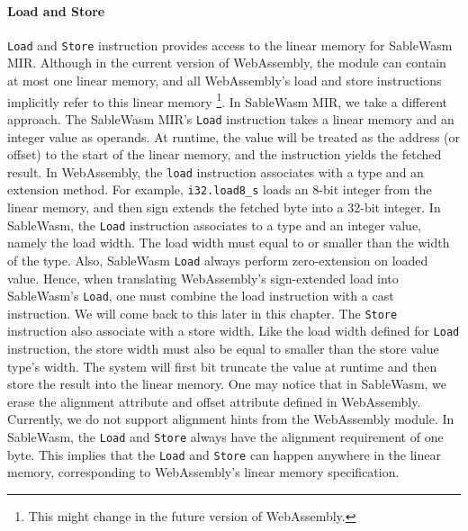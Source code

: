\paragraph{Load and Store}
\texttt{Load} and \texttt{Store} instruction provides access to the linear
memory for SableWasm MIR. Although in the current version of WebAssembly, the
module can contain at most one linear memory, and all WebAssembly's load and
store instructions implicitly refer to this linear memory \footnote{This might
  change in the future version of WebAssembly.}. In SableWasm MIR, we take a
different approach. The SableWasm MIR's \texttt{Load} instruction takes a linear
memory and an integer value as operands. At runtime, the value will be treated
as the address (or offset) to the start of the linear memory, and the
instruction yields the fetched result. In WebAssembly, the \texttt{load}
instruction associates with a type and an extension method. For example,
\texttt{i32.load8\_s} loads an 8-bit integer from the linear memory, and then
sign extends the fetched byte into a 32-bit integer. In SableWasm, the
\texttt{Load} instruction associates to a type and an integer value, namely the
load width. The load width must equal to or smaller than the width of the type.
Also, SableWasm \texttt{Load} always perform zero-extension on loaded value.
Hence, when translating WebAssembly's sign-extended load into SableWasm's
\texttt{Load}, one must combine the load instruction with a cast instruction.
We will come back to this later in this chapter. The \texttt{Store} instruction
also associate with a store width. Like the load width defined for \texttt{Load}
instruction, the store width must also be equal to smaller than the store value
type's width. The system will first bit truncate the value at runtime and then
store the result into the linear memory. One may notice that in SableWasm, we
erase the alignment attribute and offset attribute defined in WebAssembly.
Currently, we do not support alignment hints from the WebAssembly module. In
SableWasm, the \texttt{Load} and \texttt{Store} always have the alignment
requirement of one byte. This implies that the \texttt{Load} and \texttt{Store}
can happen anywhere in the linear memory, corresponding to WebAssembly's linear
memory specification.

